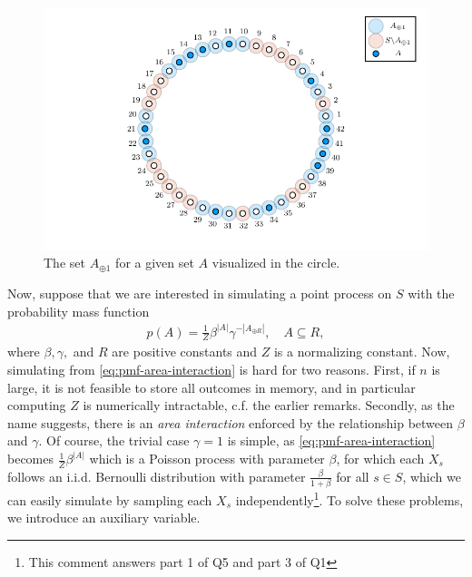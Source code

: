 \documentclass{article}
\begin{document}
\begin{figure}[ht]
    \centering
    \includegraphics[scale = 0.6]{figures/oplus_visualization.pdf}
    \caption{The set $A_{\oplus 1}$ for a given set $A$ visualized in the circle.}\label{fig:oplus_visualization}
\end{figure}
Now, suppose that we are interested in simulating a point process on $S$ with the probability mass function  
\begin{align}\label{eq:pmf-area-interaction}
    p(A) = \frac{1}{Z} \beta^{|A|} \gamma^{-|A_{\oplus R}|}, \quad A \subseteq R,
\end{align}
where $\beta, \gamma,$ and $R$ are positive constants and $Z$ is a normalizing constant. Now, simulating from \eqref{eq:pmf-area-interaction} is hard for two reasons. First, if $n$ is large, it is not feasible to store all outcomes in memory, and in particular computing $Z$ is numerically intractable, c.f. the earlier remarks. Secondly, as the name suggests, there is an \textit{area interaction} enforced by the relationship between $\beta$ and $\gamma$. Of course, the trivial case $\gamma = 1$ is simple, as \eqref{eq:pmf-area-interaction} becomes $\frac{1}{Z}\beta^{|A|}$ which is a Poisson process with parameter $\beta$, for which each $X_s$ follows an i.i.d.  Bernoulli distribution with parameter $\frac{\beta}{1 + \beta}$ for all $s \in S$, which we can easily simulate by sampling each $X_s$ independently\footnote{This comment answers part 1 of Q5 and part 3 of Q1}. \newline\newline
To solve these problems, we introduce an auxiliary variable. 
\end{document}
